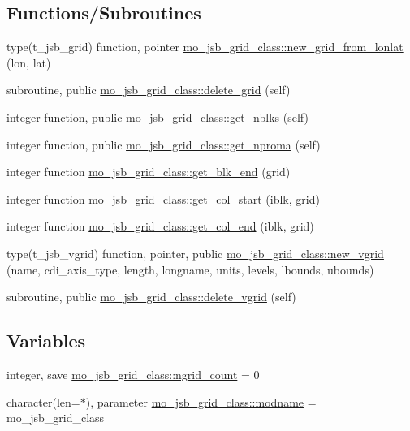 \subsection*{Functions/\+Subroutines}
\begin{DoxyCompactItemize}
\item 
type(t\+\_\+jsb\+\_\+grid) function, pointer \hyperlink{namespacemo__jsb__grid__class_a2ed0d23521e0ed882dd496dc097e941f}{mo\+\_\+jsb\+\_\+grid\+\_\+class\+::new\+\_\+grid\+\_\+from\+\_\+lonlat} (lon, lat)
\item 
subroutine, public \hyperlink{namespacemo__jsb__grid__class_a8eff8482b9f6dc02b8c703f80f962b8c}{mo\+\_\+jsb\+\_\+grid\+\_\+class\+::delete\+\_\+grid} (self)
\item 
integer function, public \hyperlink{namespacemo__jsb__grid__class_a1f7b1d1bbf7523458be54c335a83f423}{mo\+\_\+jsb\+\_\+grid\+\_\+class\+::get\+\_\+nblks} (self)
\item 
integer function, public \hyperlink{namespacemo__jsb__grid__class_a42ff42d4dc8ff6d34bc68cde0d2c9006}{mo\+\_\+jsb\+\_\+grid\+\_\+class\+::get\+\_\+nproma} (self)
\item 
integer function \hyperlink{namespacemo__jsb__grid__class_afc8f2ee4e73381a9ff8eb402d89c4eee}{mo\+\_\+jsb\+\_\+grid\+\_\+class\+::get\+\_\+blk\+\_\+end} (grid)
\item 
integer function \hyperlink{namespacemo__jsb__grid__class_a1a350aded77ade355944cec2a0d972f1}{mo\+\_\+jsb\+\_\+grid\+\_\+class\+::get\+\_\+col\+\_\+start} (iblk, grid)
\item 
integer function \hyperlink{namespacemo__jsb__grid__class_affffc8eaeee7b83491f39d21150f2c78}{mo\+\_\+jsb\+\_\+grid\+\_\+class\+::get\+\_\+col\+\_\+end} (iblk, grid)
\item 
type(t\+\_\+jsb\+\_\+vgrid) function, pointer, public \hyperlink{namespacemo__jsb__grid__class_a9b97575796bec8269c7381e0ffedd2d8}{mo\+\_\+jsb\+\_\+grid\+\_\+class\+::new\+\_\+vgrid} (name, cdi\+\_\+axis\+\_\+type, length, longname, units, levels, lbounds, ubounds)
\item 
subroutine, public \hyperlink{namespacemo__jsb__grid__class_a14a5dddab870a130135f43b849588a3f}{mo\+\_\+jsb\+\_\+grid\+\_\+class\+::delete\+\_\+vgrid} (self)
\end{DoxyCompactItemize}
\subsection*{Variables}
\begin{DoxyCompactItemize}
\item 
integer, save \hyperlink{namespacemo__jsb__grid__class_ad64217c2b3f2f8da3c4b7297bc650ae4}{mo\+\_\+jsb\+\_\+grid\+\_\+class\+::ngrid\+\_\+count} = 0
\item 
character(len=$\ast$), parameter \hyperlink{namespacemo__jsb__grid__class_a2d6c1334c4fbe274a9f0b7acd6fd6361}{mo\+\_\+jsb\+\_\+grid\+\_\+class\+::modname} = \textquotesingle{}mo\+\_\+jsb\+\_\+grid\+\_\+class\textquotesingle{}
\end{DoxyCompactItemize}
